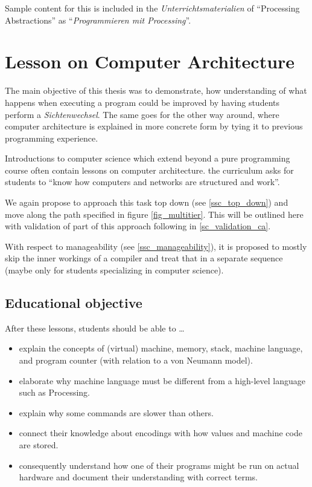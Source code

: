 Sample content for this is included in the \emph{Unterrichtsmaterialien} of  ``Processing Abstractions'' as ``\emph{Programmieren mit Processing}''.



\section{Lesson on Computer Architecture} \label{sc_lesson_ca}

The main objective of this thesis was to demonstrate, how understanding of what happens when executing a program could be improved by having students perform a \emph{Sichtenwechsel}. The same goes for the other way around, where computer architecture is explained in more concrete form by tying it to previous programming experience.

Introductions to computer science which extend beyond a pure programming course often contain lessons on computer architecture. \eg the curriculum \cite[p.\,145]{Erz16} asks for students to ``know how computers and networks are structured and work''.

We again propose to approach this task top down (see \ref{ssc_top_down}) and move along the path specified in figure \ref{fig_multitier}. This will be outlined here with validation of part of this approach following in \ref{sc_validation_ca}.

With respect to manageability (see \ref{ssc_manageability}), it is proposed to mostly skip the inner workings of a compiler and treat that in a separate sequence (maybe only for students specializing in computer science).


\subsection{Educational objective}

After these lessons, students should be able to \dots
\begin{itemize}
\item explain the concepts of (virtual) machine, memory, stack, machine language, and program counter (with relation to a von Neumann model).
\item elaborate why machine language must be different from a high-level language such as Processing.
\item explain why some commands are slower than others.
\item connect their knowledge about encodings with how values and machine code are stored.
\item consequently understand how one of their programs might be run on actual hardware and document their understanding with correct terms.
\end{itemize}


